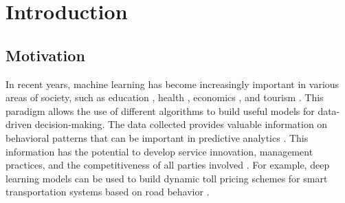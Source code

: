 \documentclass[12pt]{book}
\begin{document}

\chapter{Introduction}

\section{Motivation}

In recent years, machine learning has become increasingly important in various areas of society, such as education \citep{bujang2021multiclass,aburayya2023sem}, health \citep{das2023patient,garcia2020cnn}, economics \citep{kumar2022systematic,lokanan2022fraud}, and tourism \citep{kitsios2022user,bolanos2024clustering}. This paradigm allows the use of different algorithms to build useful models for data-driven decision-making. The data collected provides valuable information on behavioral patterns that can be important in predictive analytics \citep{jain2020overview}. This information has the potential to develop service innovation, management practices, and the competitiveness of all parties involved \citep{buhalis2020technology}. For example, deep learning models can be used to build dynamic toll pricing schemes for smart transportation systems based on road behavior \citep{shukla2020dwara}.
\end{document}
